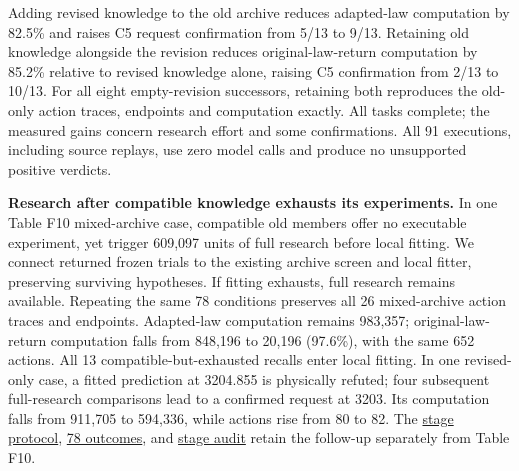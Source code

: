 \documentclass[11pt,a4paper]{article}
\begin{document}
Adding revised knowledge to the old archive reduces adapted-law computation by 82.5\% and raises C5 request confirmation from 5/13 to 9/13. Retaining old knowledge alongside the revision reduces original-law-return computation by 85.2\% relative to revised knowledge alone, raising C5 confirmation from 2/13 to 10/13. For all eight empty-revision successors, retaining both reproduces the old-only action traces, endpoints and computation exactly. All tasks complete; the measured gains concern research effort and some confirmations. All 91 executions, including source replays, use zero model calls and produce no unsupported positive verdicts.


\textbf{Research after compatible knowledge exhausts its experiments.} In one Table F10 mixed-archive case, compatible old members offer no executable experiment, yet trigger 609,097 units of full research before local fitting. We connect returned frozen trials to the existing archive screen and local fitter, preserving surviving hypotheses. If fitting exhausts, full research remains available. Repeating the same 78 conditions preserves all 26 mixed-archive action traces and endpoints. Adapted-law computation remains 983,357; original-law-return computation falls from 848,196 to 20,196 (97.6\%), with the same 652 actions. All 13 compatible-but-exhausted recalls enter local fitting. In one revised-only case, a fitted prediction at 3204.855 is physically refuted; four subsequent full-research comparisons lead to a confirmed request at 3203. Its computation falls from 911,705 to 594,336, while actions rise from 80 to 82. The \hyperlink{artifact-148}{stage protocol}, \hyperlink{artifact-149}{78 outcomes}, and \hyperlink{artifact-150}{stage audit} retain the follow-up separately from Table F10.
\end{document}
